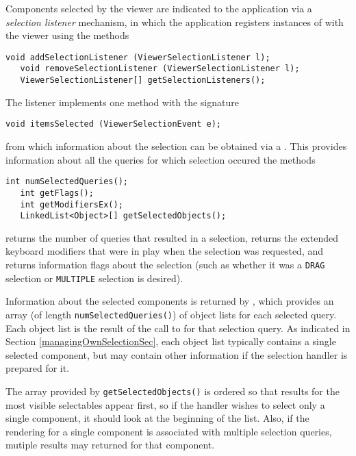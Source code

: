 Components selected by the viewer are indicated to the application via a
{\it selection listener} mechanism, in which the application registers
instances of  with the viewer
using the methods
\begin{lstlisting}[]
   void addSelectionListener (ViewerSelectionListener l);
   void removeSelectionListener (ViewerSelectionListener l);
   ViewerSelectionListener[] getSelectionListeners();
\end{lstlisting}
The listener implements one method with the signature
\begin{lstlisting}[]
   void itemsSelected (ViewerSelectionEvent e);
\end{lstlisting}
from which information about the selection can be obtained via a
. 
This provides information about all the
queries for which selection occured the methods
\begin{lstlisting}[]
   int numSelectedQueries();
   int getFlags();
   int getModifiersEx();
   LinkedList<Object>[] getSelectedObjects();
\end{lstlisting}
returns the number
of queries that resulted in a selection,
returns the extended
keyboard modifiers that were in play when the selection was requested,
and  returns information
flags about the selection (such as whether it was a {\tt DRAG}
selection or {\tt MULTIPLE} selection is desired).

Information about the selected components is returned by
, 
which provides an
array (of length {\tt numSelectedQueries()}) of object lists for
each selected query. Each object list is the result of the call to
 for that 
selection query. As
indicated in Section \ref{managingOwnSelectionSec}, each object list
typically contains a single selected component, but may contain other
information if the selection handler is prepared for it.

The array provided by {\tt getSelectedObjects()} is ordered so that
results for the most visible selectables appear first, so if the
handler wishes to select only a single component, it should look at
the beginning of the list. Also, if the rendering for a single
component is associated with multiple selection queries, mutiple
results may returned for that component.

